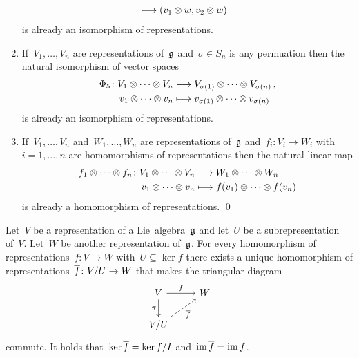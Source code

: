 \begin{proposition}
\begin{enumerate}
\begin{align*}
        &\longmapsto
        (v_1 \otimes w, v_2 \otimes w)
      \end{align*}
      is already an isomorphism of representations.
    \item
      If~$V_1, \dotsc, V_n$ are representations of~$\mathfrak{g}$ and~$\sigma \in S_n$ is any permuation then the natural isomorphism of vector spaces
      \begin{align*}
        \Phi_5
        \colon 
        V_1 \otimes \dotsb \otimes V_n
        &\longrightarrow
        V_{\sigma(1)} \otimes \dotsb \otimes V_{\sigma(n)} \,,
        \\
        v_1 \otimes \dotsb \otimes v_n
        &\longmapsto
        v_{\sigma(1)} \otimes \dotsb \otimes v_{\sigma(n)}
      \end{align*}
      is already an isomorphism of representations.
    \item
      If~$V_1, \dotsc, V_n$ and~$W_1, \dotsc, W_n$ are representations of~$\mathfrak{g}$ and~$f_i \colon V_i \to W_i$ with~$i = 1, \dotsc, n$ are homomorphisms of representations then the natural linear map
      \begin{align*}
        f_1 \otimes \dotsb \otimes f_n
        \colon
        V_1 \otimes \dotsb \otimes V_n
        &\longrightarrow
        W_1 \otimes \dotsb \otimes W_n
        \\
        v_1 \otimes \dotsb \otimes v_n
        &\longmapsto
        f(v_1) \otimes \dotsb \otimes f(v_n)
      \end{align*}
      is already a homomorphism of representations.
    \qed
  \end{enumerate}
\end{proposition}


\begin{proposition}
  \label{homomorphism theorem!for representations}
  Let~$V$ be a representation of a Lie~algebra~$\mathfrak{g}$ and let~$U$ be a subrepresentation of~$V$.
  Let~$W$ be another representation of~$\mathfrak{g}$.
  For every homomorphism of representations~$f \colon V \to W$ with~$U \subseteq \ker f$ there exists a unique homomorphism of representations~$\overline{f} \colon V/U \to W$ that makes the triangular diagram
  \[
    \begin{tikzcd}
      V
      \arrow{r}[above]{f}
      \arrow{d}[left]{\pi}
      &
      W
      \\
      V/U
      \arrow[dashed]{ur}[below right]{\induced{f}}
      &
      {}
    \end{tikzcd}
  \]
  commute.
  It holds that~$\ker \overline{f} = {\ker f}/I$ and~$\operatorname{im} \overline{f} = \operatorname{im} f$.
\end{proposition}


